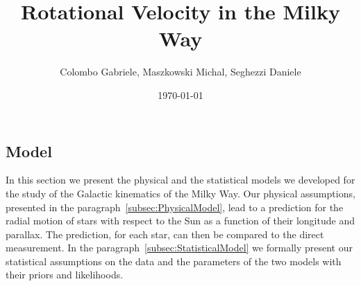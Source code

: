 \documentclass{article}
\title{Rotational Velocity in the Milky Way}
\author{Colombo Gabriele, Maszkowski Michal, Seghezzi Daniele}
\date{\today}
\begin{document}
\linenumbers

\maketitle



\begin{multicols}{2}

\section{Model}
In this section we present the physical and the statistical models we developed for the study of the Galactic kinematics of the Milky Way. Our physical assumptions, presented in the paragraph~\ref{subsec:PhysicalModel}, lead to a prediction for the radial motion of stars with respect to the Sun as a function of their longitude and parallax. The prediction, for each star, can then be compared to the direct measurement. In the paragraph~\ref{subsec:StatisticalModel} we formally present our statistical assumptions on the data and the parameters of the two models with their priors and likelihoods.





\end{multicols} 


\printbibliography

\end{document}
